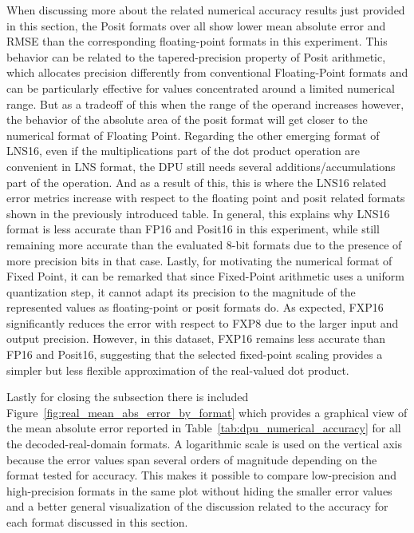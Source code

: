 When discussing more about the related numerical accuracy results just provided in this section, the Posit formats over all show lower mean absolute error and RMSE than the corresponding floating-point formats in this experiment. This behavior can be related to the tapered-precision property of Posit arithmetic, which allocates precision differently from conventional Floating-Point formats and can be particularly effective for values concentrated around a limited numerical range. But as a tradeoff of this when the range of the operand increases however, the behavior of the absolute area of the posit format will get closer to the numerical format of Floating Point. Regarding the other emerging format of LNS16,  even if the multiplications part of the dot product operation are convenient in LNS format, the DPU still needs several additions/accumulations part of the operation. And as a result of this, this is where the LNS16 related error metrics increase with respect to the floating point and posit related formats shown in the previously introduced table. In general,  this explains why LNS16 format is less accurate than FP16 and Posit16 in this experiment, while still remaining more accurate than the evaluated 8-bit formats due to the presence of more precision bits in that case. Lastly, for motivating the numerical format of Fixed Point, it can be remarked that since Fixed-Point arithmetic uses a uniform quantization step, it cannot adapt its precision to the magnitude of the represented values as floating-point or posit formats do. As expected, FXP16 significantly reduces the error with respect to FXP8 due to the larger input and output precision. However, in this dataset, FXP16 remains less accurate than FP16 and Posit16, suggesting that the selected fixed-point scaling provides a simpler but less flexible approximation of the real-valued dot product.

Lastly for closing the subsection there is included Figure~\ref{fig:real_mean_abs_error_by_format} which provides a graphical view of the mean absolute error reported in Table~\ref{tab:dpu_numerical_accuracy} for all the decoded-real-domain formats. A logarithmic scale is used on the vertical axis because the error values span several orders of magnitude depending on the format tested for accuracy. This makes it possible to compare low-precision and high-precision formats in the same plot without hiding the smaller error values and a better general visualization of the discussion related to the accuracy for each format discussed in this section.


